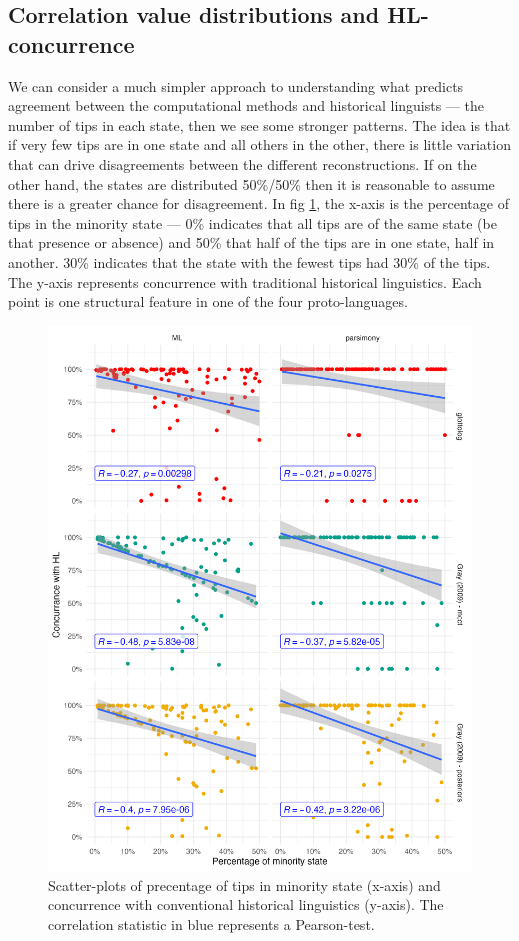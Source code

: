 \documentclass[12pt,letterpaper]{article}
\begin{document}
\subsection{Correlation value distributions and HL-concurrence}
\label{supp:cor_min_p_HL}
We can consider a much simpler approach to understanding what predicts agreement between the computational methods and historical linguists --- the number of tips in each state, then we see some stronger patterns. The idea is that if very few tips are in one state and all others in the other, there is little variation that can drive disagreements between the different reconstructions. If on the other hand, the states are distributed 50\%/50\% then it is reasonable to assume there is a greater chance for disagreement. In fig  \ref{fig:min_p_vs_concurrence}, the x-axis is the percentage of tips in the minority state --- 0\% indicates that all tips are of the same state (be that presence or absence) and 50\% that half of the tips are in one state, half in another. 30\% indicates that the state with the fewest tips had 30\% of the tips. The y-axis represents concurrence with traditional historical linguistics. Each point is one structural feature in one of the four proto-languages.

\begin{figure}[ht]
\centering
\includegraphics[width=12cm]{illustrations/plots_from_R/min_p_vs_HL_concurrance.png}
\caption{Scatter-plots of precentage of tips in minority state (x-axis) and concurrence with conventional historical linguistics (y-axis). The correlation statistic in blue represents a Pearson-test.}
\label{fig:min_p_vs_concurrence}
\end{figure}
\end{document}
